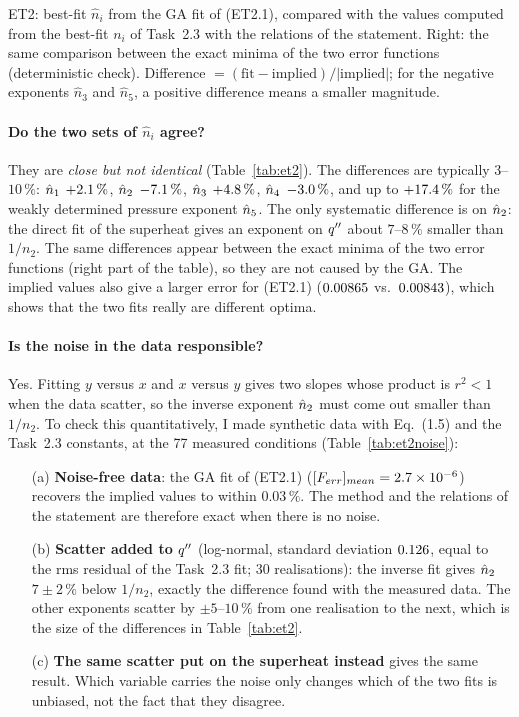 \begin{table}[H]
\centering\small
\caption{ET2: best-fit $\hat n_i$ from the GA fit of (ET2.1), compared with the values computed from
the best-fit $n_i$ of Task~2.3 with the relations of the statement. Right: the same comparison between the
exact minima of the two error functions (deterministic check). Difference $=(\text{fit}-\text{implied})/|\text{implied}|$;
for the negative exponents $\hat n_3$ and $\hat n_5$, a positive difference means a smaller magnitude.}
\label{tab:et2}
\end{table}

\paragraph{Do the two sets of $\hat n_i$ agree?}
They are \emph{close but not identical} (Table~\ref{tab:et2}). The differences are typically
$3$--$10\,\%$: $\hat{n}_{1}$ $+2.1\,\%$, $\hat{n}_{2}$ $-7.1\,\%$, $\hat{n}_{3}$ $+4.8\,\%$, $\hat{n}_{4}$
$-3.0\,\%$, and up to $+17.4\,\%$ for the weakly determined pressure exponent $\hat{n}_{5}$. The
only systematic difference is on $\hat{n}_{2}$: the direct fit of the superheat gives an exponent on $q''$
about $7$--$8\,\%$ smaller than $1/n_2$. The same differences appear between the exact minima of the two
error functions (right part of the table), so they are not caused by the GA. The implied values also give a
larger error for (ET2.1) ($0.00865$ vs.\ $0.00843$), which shows that the two fits really are different
optima.

\paragraph{Is the noise in the data responsible?}
Yes. Fitting $y$ versus $x$ and $x$ versus $y$ gives two slopes whose product is $r^2<1$ when the data
scatter, so the inverse exponent $\hat{n}_{2}$ must come out smaller than $1/n_2$. To check this quantitatively,
I made synthetic data with Eq.~(1.5) and the Task~2.3 constants, at the 77 measured conditions
(Table~\ref{tab:et2noise}):
\begin{itemize}
  \item[(a)] \textbf{Noise-free data}: the GA fit of (ET2.1) ($[F_{err}]_{mean}=2.7\times10^{-6}$) recovers the
        implied values to within $0.03\,\%$. The method and the relations of the statement are therefore
        exact when there is no noise.
  \item[(b)] \textbf{Scatter added to $q''$} (log-normal, standard deviation $0.126$, equal to the
        rms residual of the Task~2.3 fit; 30 realisations): the inverse fit gives $\hat{n}_{2}$ $7\pm2\,\%$ below
        $1/n_2$, exactly the difference found with the measured data. The other exponents scatter by
        $\pm5$--$10\,\%$ from one realisation to the next, which is the size of the differences in
        Table~\ref{tab:et2}.
  \item[(c)] \textbf{The same scatter put on the superheat instead} gives the same result. Which variable
        carries the noise only changes which of the two fits is unbiased, not the fact that they disagree.
\end{itemize}


